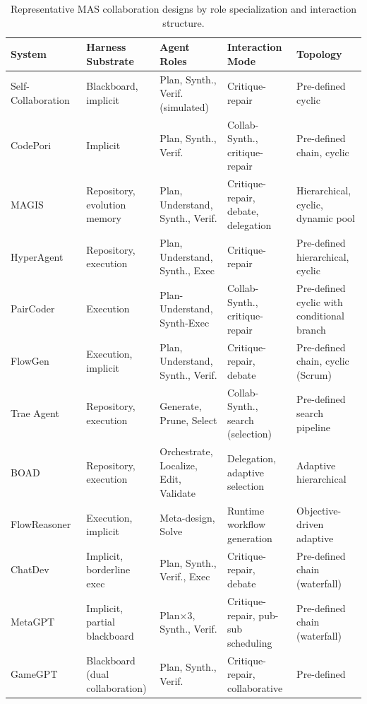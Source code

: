 \documentclass{llmxive}
\providecommand{\arraystretch}{1.15}
\begin{document}
\begin{table}[t]
\centering
\renewcommand{\arraystretch}{1.16}
\setlength{\tabcolsep}{3.5pt}
\footnotesize
\begin{tabularx}{\textwidth}{@{}
  >{\arraybackslash}p{2.55cm}
  >{\arraybackslash}p{2.85cm}
  >{\arraybackslash}p{3.05cm}
  >{\arraybackslash}p{3.05cm}
  >{\arraybackslash}X@{}}
\toprule
\textbf{System}
& \textbf{Harness Substrate}
& \textbf{Agent Roles}
& \textbf{Interaction Mode}
& \textbf{Topology} \\
\midrule
Self-Collaboration~\cite{Dong2024SelfCollaboration}
& Blackboard, implicit
& Plan, Synth., Verif. (simulated)
& Critique-repair
& Pre-defined cyclic \\ \midrule
CodePori~\cite{Rasheed2024Codepori}
& Implicit
& Plan, Synth., Verif.
& Collab-Synth., critique-repair
& Pre-defined chain, cyclic \\ \midrule
MAGIS~\cite{Tao2024Magis}
& Repository, evolution memory
& Plan, Understand, Synth., Verif.
& Critique-repair, debate, delegation
& Hierarchical, cyclic, dynamic pool \\ \midrule
HyperAgent~\cite{Phan2024HyperAgent}
& Repository, execution
& Plan, Understand, Synth., Exec
& Critique-repair
& Pre-defined hierarchical, cyclic \\ \midrule
PairCoder~\cite{Zhang2024PairProgramming}
& Execution
& Plan-Understand, Synth-Exec
& Collab-Synth., critique-repair
& Pre-defined cyclic with conditional branch \\ \midrule
FlowGen~\cite{Lin2025Soen101}
& Execution, implicit
& Plan, Understand, Synth., Verif.
& Critique-repair, debate
& Pre-defined chain, cyclic (Scrum) \\ \midrule
Trae Agent~\cite{gao2025traeagent}
& Repository, execution
& Generate, Prune, Select
& Collab-Synth., search (selection)
& Pre-defined search pipeline \\ \midrule
BOAD~\cite{xu2025boad}
& Repository, execution
& Orchestrate, Localize, Edit, Validate
& Delegation, adaptive selection
& Adaptive hierarchical \\ \midrule
FlowReasoner~\cite{gao2025flowreasoner}
& Execution, implicit
& Meta-design, Solve
& Runtime workflow generation
& Objective-driven adaptive \\ \midrule
ChatDev~\cite{Qian2023ChatDev}
& Implicit, borderline exec
& Plan, Synth., Verif., Exec
& Critique-repair, debate
& Pre-defined chain (waterfall) \\ \midrule
MetaGPT~\cite{Hong2023MetaGPT}
& Implicit, partial blackboard
& Plan$\times$3, Synth., Verif.
& Critique-repair, pub-sub scheduling
& Pre-defined chain (waterfall) \\ \midrule
GameGPT~\cite{chen2023gamegpt}
& Blackboard (dual collaboration)
& Plan, Synth., Verif.
& Critique-repair, collaborative
& Pre-defined \\
\bottomrule
\end{tabularx}
\caption{Representative MAS collaboration designs by role specialization and interaction structure. }
\label{tab:mas_collaboration_systems}
\end{table}
\end{document}
